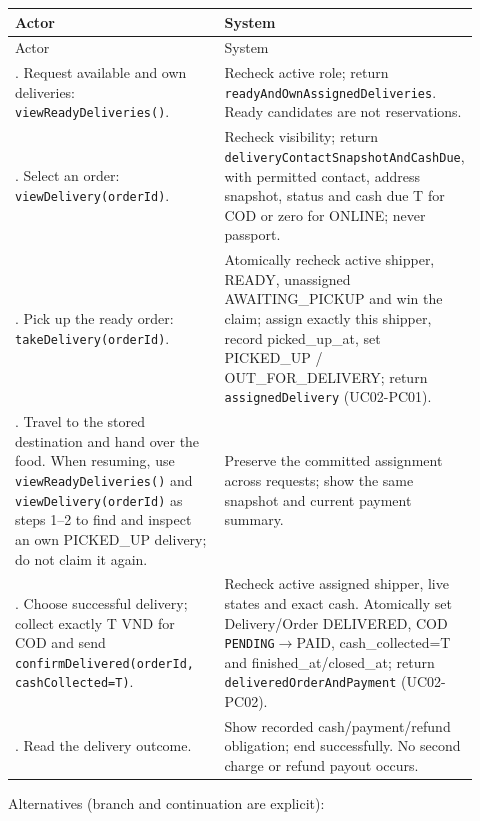 \begin{longtable}{>{\raggedright\arraybackslash}p{0.4600\linewidth}>{\raggedright\arraybackslash}p{0.4600\linewidth}}
Actor & System \\
\hline\endfirsthead
Actor & System \\
\hline\endhead
1. Request available and own deliveries: \texttt{viewReadyDeliveries()}. & Recheck active role; return \texttt{readyAndOwnAssignedDeliveries}. Ready candidates are not reservations. \\
2. Select an order: \texttt{viewDelivery(orderId)}. & Recheck visibility; return \texttt{deliveryContactSnapshotAndCashDue}, with permitted contact, address snapshot, status and cash due T for COD or zero for ONLINE; never passport. \\
3. Pick up the ready order: \texttt{takeDelivery(orderId)}. & Atomically recheck active shipper, READY, unassigned AWAITING\_PICKUP and win the claim; assign exactly this shipper, record picked\_up\_at, set PICKED\_UP / OUT\_FOR\_DELIVERY; return \texttt{assignedDelivery} (UC02-PC01). \\
4. Travel to the stored destination and hand over the food. When resuming, use \texttt{viewReadyDeliveries()} and \texttt{viewDelivery(orderId)} as steps 1--2 to find and inspect an own PICKED\_UP delivery; do not claim it again. & Preserve the committed assignment across requests; show the same snapshot and current payment summary. \\
5. Choose successful delivery; collect exactly T VND for COD and send \texttt{confirmDelivered(orderId, cashCollected=T)}. & Recheck active assigned shipper, live states and exact cash. Atomically set Delivery/Order DELIVERED, COD \texttt{PENDING}\ensuremath{\rightarrow}PAID, cash\_collected=T and finished\_at/closed\_at; return \texttt{deliveredOrderAndPayment} (UC02-PC02). \\
6. Read the delivery outcome. & Show recorded cash/payment/refund obligation; end successfully. No second charge or refund payout occurs. \\
\end{longtable}
Alternatives (branch and continuation are explicit):

